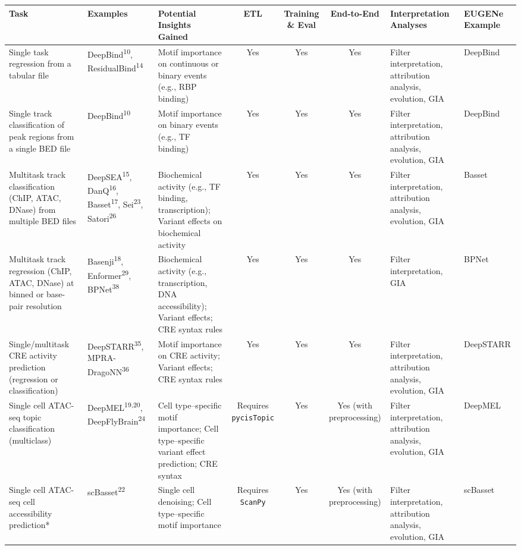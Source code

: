 \begin{landscape}
\begin{table}[ht]
\renewcommand{\arraystretch}{0.2} %
\begin{tabularx}{\linewidth}{|l|l|X|c|c|c|X|l|}
\hline
\textbf{Task} & \textbf{Examples} & \textbf{Potential Insights Gained} & \textbf{ETL} & \textbf{Training \& Eval} & \textbf{End-to-End} & \textbf{Interpretation Analyses} & \textbf{EUGENe Example} \\
\hline
Single task regression from a tabular file & DeepBind\textsuperscript{10}, ResidualBind\textsuperscript{14} & Motif importance on continuous or binary events (e.g., RBP binding) & Yes & Yes & Yes & Filter interpretation, attribution analysis, evolution, GIA & DeepBind \\
\hline
Single track classification of peak regions from a single BED file & DeepBind\textsuperscript{10} & Motif importance on binary events (e.g., TF binding) & Yes & Yes & Yes & Filter interpretation, attribution analysis, evolution, GIA & DeepBind \\
\hline
Multitask track classification (ChIP, ATAC, DNase) from multiple BED files & DeepSEA\textsuperscript{15}, DanQ\textsuperscript{16}, Basset\textsuperscript{17}, Sei\textsuperscript{23}, Satori\textsuperscript{26} & Biochemical activity (e.g., TF binding, transcription); Variant effects on biochemical activity & Yes & Yes & Yes & Filter interpretation, attribution analysis, evolution, GIA & Basset \\
\hline
Multitask track regression (ChIP, ATAC, DNase) at binned or base-pair resolution & Basenji\textsuperscript{18}, Enformer\textsuperscript{29}, BPNet\textsuperscript{38} & Biochemical activity (e.g., transcription, DNA accessibility); Variant effects; CRE syntax rules & Yes & Yes & Yes & Filter interpretation, GIA & BPNet \\
\hline
Single/multitask CRE activity prediction (regression or classification) & DeepSTARR\textsuperscript{35}, MPRA-DragoNN\textsuperscript{36} & Motif importance on CRE activity; Variant effects; CRE syntax rules & Yes & Yes & Yes & Filter interpretation, attribution analysis, evolution, GIA & DeepSTARR \\
\hline
Single cell ATAC-seq topic classification (multiclass) & DeepMEL\textsuperscript{19,20}, DeepFlyBrain\textsuperscript{24} & Cell type–specific motif importance; Cell type–specific variant effect prediction; CRE syntax & Requires \texttt{pycisTopic} & Yes & Yes (with preprocessing) & Filter interpretation, attribution analysis, evolution, GIA & DeepMEL \\
\hline
Single cell ATAC-seq cell accessibility prediction* & scBasset\textsuperscript{22} & Single cell denoising; Cell type–specific motif importance & Requires \texttt{ScanPy} & Yes & Yes (with preprocessing) & Filter interpretation, attribution analysis, evolution, GIA & scBasset \\
\hline
\end{tabularx}
\end{table}
\end{landscape}

